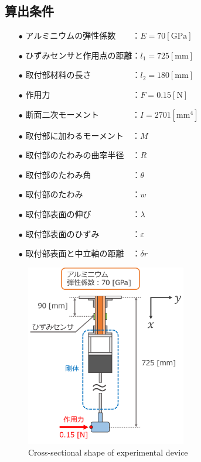 \documentclass[twocolumn,a4j]{jsarticle}
\begin{document}
\subsection{算出条件}
\begin{screen}
    \begin{itemize}
        \item [$\bullet$] アルミニウムの弾性係数　　：$E = 70 \left[\mathrm{GPa}\right]$
        \item [$\bullet$] ひずみセンサと作用点の距離：$l_1 = 725 \left[\mathrm{mm}\right]$
        \item [$\bullet$] 取付部材料の長さ　　　　　：$l_2 = 180 \left[\mathrm{mm}\right]$
        \item [$\bullet$] 作用力　　　　　　　　　　：$F = 0.15 \left[\mathrm{N}\right]$
        \item [$\bullet$] 断面二次モーメント　　　　：$I = 2701 \left[\mathrm{mm^4}\right]$
        \item [$\bullet$] 取付部に加わるモーメント　：$M$
        \item [$\bullet$] 取付部のたわみの曲率半径　：$R$
        \item [$\bullet$] 取付部のたわみ角　　　　　：$\theta$
        \item [$\bullet$] 取付部のたわみ　　　　　　：$w$
        \item [$\bullet$] 取付部表面の伸び　　　　　：$\lambda$
        \item [$\bullet$] 取付部表面のひずみ　　　　：$\varepsilon$
        \item [$\bullet$] 取付部表面と中立軸の距離　：$\delta r$
    \end{itemize}
\end{screen}

\begin{figure}[htbp]
    \footnotesize
    \begin{center}
        \includegraphics[width=70mm]{../images/moment.png}
        \caption{Cross-sectional shape of experimental device}
    \end{center}
\end{figure}
\end{document}
